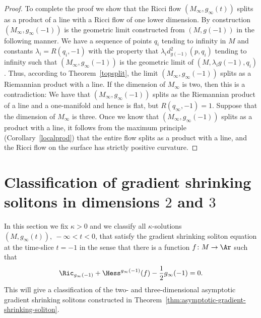 \begin{proof}
To complete the proof we show that the Ricci flow $(M_\infty,g_\infty(t))$
splits as a product of a line with a Ricci flow of one lower dimension. By
construction $(M_\infty,g_\infty(-1))$ is the geometric limit constructed from
$(M,g(-1))$ in the following manner. We have a sequence of points $q_i$ tending
to infinity in $M$ and constants $\lambda_i=R(q_i,-1)$ with the property that
$\lambda_id^2_{g(-1)}(p,q_i)$ tending to infinity such that
$(M_\infty,g_\infty(-1))$ is the geometric limit of $(M,\lambda_ig(-1),q_i)$.
 Thus, according
to Theorem~\ref{topsplit}, the limit $(M_\infty,g_\infty(-1))$ splits as a
Riemannian product with a line. If the dimension of $M_\infty$ is two, then
this is a contradiction: We have that $(M_\infty,g_\infty(-1))$ splits as the
Riemannian product of a line and a one-manifold and hence is flat, but
$R(q_\infty,-1)=1$. Suppose that the dimension of $M_\infty$ is three. Once we
know that $(M_\infty,g_\infty(-1))$ splits as a product with a line, it follows
from the maximum principle (Corollary~\ref{localprod}) that the entire flow
splits as a product with a line, and the Ricci flow on the surface has strictly
positive curvature.
\end{proof}


\section{Classification of gradient shrinking solitons in dimensions $2$ and $ 3$}

In this section we fix $\kappa>0$ and we classify all
$\kappa$-solutions $(M,g_\infty(t)),\ -\infty<t<0$, that satisfy the
gradient shrinking soliton equation at the time-slice $t=-1$ in the
sense that there is a function $f\colon M \to \Ar$ such that
\begin{eqnarray}\label{GSS-1}
\Ric_{g_\infty(-1)}+\Hess^{g_\infty(-1)}(f)-\frac{1}{2}
g_\infty(-1)=0.\end{eqnarray} This will give a classification of the
two- and three-dimensional asymptotic gradient shrinking solitons
constructed in Theorem~\ref{thm:asymptotic-gradient-shrinking-soliton}.


